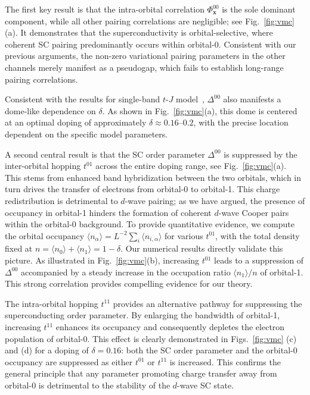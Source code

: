 \documentclass[reprint,superscriptaddress,amsmath,amssymb,aps,twocolumn]{revtex4-1}
\begin{document}
The first key result is that the intra-orbital correlation $\Phi_{\mathbf{x}}^{00}$ is the sole dominant component, while all other pairing correlations are negligible; see Fig.~\ref{fig:vmc}(a). 
It demonstrates that the superconductivity is orbital-selective, where coherent SC pairing predominantly occurs within orbital-0.
Consistent with our previous arguments, the non-zero variational pairing parameters in the other channels merely manifest as a pseudogap, which fails to establish long-range pairing correlations.

Consistent with the results for single-band $t$-$J$ model~\cite{1988Shibab}, $\Delta^{00}$ also manifests a dome-like dependence on $\delta$. As shown in Fig.~\ref{fig:vmc}(a), this dome is centered at an optimal doping of approximately $\delta \approx 0.16 \text{--} 0.2$, with the precise location dependent on the specific model parameters.

A second central result is that the SC order parameter $\Delta^{00}$ is suppressed by the inter-orbital hopping $t^{01}$ across the entire doping range, see Fig.~\ref{fig:vmc}(a). This stems from enhanced band hybridization between the two orbitals, which in turn drives the transfer of electrons from orbital-0 to orbital-1. This charge redistribution is detrimental to $d$-wave pairing; as we have argued, the presence of occupancy in orbital-1 hinders the formation of coherent $d$-wave Cooper pairs within the orbital-0 background. To provide quantitative evidence, we compute the orbital occupancy $\langle n_\alpha\rangle = L^{-2} \sum_{i}\langle n_{i,\alpha}\rangle$ for various $t^{01}$, with the total density fixed at $n=\langle n_0\rangle + \langle n_1\rangle = 1-\delta$. Our numerical results directly validate this picture. As illustrated in Fig.~\ref{fig:vmc}(b), increasing $t^{01}$ leads to a suppression of $\Delta^{00}$ accompanied by a steady increase in the occupation ratio $\langle n_1\rangle/n$ of orbital-1. This strong correlation provides compelling evidence for our theory. 

The intra-orbital hopping $t^{11}$ provides an alternative pathway for suppressing the superconducting order parameter. By enlarging the bandwidth of orbital-1, increasing $t^{11}$ enhances its occupancy and consequently depletes the electron population of orbital-0. This effect is clearly demonstrated in Figs.~\ref{fig:vmc} (c) and (d) for a doping of $\delta=0.16$: both the SC order parameter and the orbital-0 occupancy are suppressed as either $t^{01}$ or $t^{11}$ is increased. This confirms the general principle that any parameter promoting charge transfer away from orbital-0 is detrimental to the stability of the $d$-wave SC state.
\end{document}
